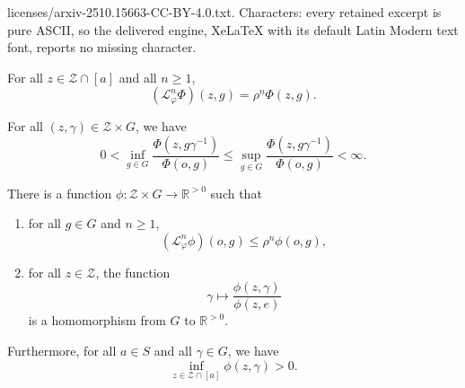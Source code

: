 \documentclass[10pt,a4paper]{amsart}
\def\vp{\varphi}
\begin{document}
licenses/arxiv-2510.15663-CC-BY-4.0.txt. Characters: every retained excerpt is pure ASCII, so the delivered engine, XeLaTeX with its default Latin Modern text font, reports no missing character.
\begin{lemma}\label{lem:eigenvalue_equation}
For all $z \in \mathcal Z \cap [a]$ and all $n \ge 1$,
\[
(\mathcal L_{\vp}^n\Phi)(z,g) = \rho^n\Phi(z,g).
\]
\end{lemma}

\begin{corollary}\label{cor:gamma_bounded}
For all $(z,\gamma) \in \mathcal Z \times G$, we have
\[
0 < \inf_{g \in G} \frac{\Phi(z, g\gamma^{-1})}{\Phi(o,g)} \le
\sup_{g \in G} \frac{\Phi(z,g\gamma^{-1})}{\Phi(o,g)} < 
\infty.
\]
\end{corollary}

\begin{lemma}\label{lem:inequality_for_phi}
There is a function $\phi : \mathcal Z \times G \to \mathbb R^{>0}$ such that
\begin{enumerate}
\item
for all $g \in G$ and $n \ge 1$,
\[
(\mathcal L_{\vp}^n \phi)(o,g) \le \rho^n \phi(o,g),
\]
\item
for all $z \in \mathcal Z$, the function
\[
\gamma \mapsto \frac{\phi(z,\gamma)}{\phi(z,e)}
\]
is a homomorphism from $G$ to $\mathbb R^{>0}$.
\end{enumerate}
Furthermore, for all $a \in S$ and all $\gamma \in G$, we have
\[
\inf_{z \in \mathcal Z \cap [a]} \phi(z,\gamma) >0.
\]
\end{lemma}
\end{document}
